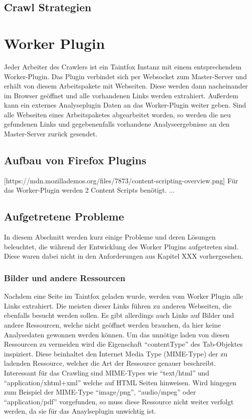 \subsection{Crawl Strategien}
\section{Worker Plugin}
Jeder Arbeiter des Crawlers ist ein Taintfox Instanz mit einem entsprechendem Worker-Plugin. Das Plugin verbindet sich per Websocket zum Master-Server und erhält von diesem Arbeitspakete mit Webseiten. Diese werden dann nacheinander im Browser geöffnet und alle vorhandenen Links werden extrahiert. Außerdem kann ein externes Analyseplugin Daten an das Worker-Plugin weiter geben. Sind alle Webseiten eines Arbeitspaketes abgearbeitet worden, so werden die neu gefundenen Links und gegebenenfalls vorhandene Analyseergebnisse an den Master-Server zurück gesendet.
\subsection{Aufbau von Firefox Plugins}
 [https://mdn.mozillademos.org/files/7873/content-scripting-overview.png]
Für das Worker-Plugin werden 2 Content Scripts benötigt. ...
\subsection{Aufgetretene Probleme}
In diesem Abschnitt werden kurz einige Probleme und deren Lösungen beleuchtet, die während der Entwicklung des Worker Plugins aufgetreten sind. Diese waren dabei nicht in den Anforderungen aus Kapitel XXX vorhergesehen.
\subsubsection{Bilder und andere Ressourcen}
Nachdem eine Seite im Taintfox geladen wurde, werden vom Worker Plugin alle Links extrahiert. Die meisten dieser Links führen zu anderen Webseiten, die ebenfalls besucht werden sollen. Es gibt allerdings auch Links auf Bilder und andere Ressourcen, welche nicht geöffnet werden brauchen, da hier keine Analysedaten gewonnen werden können. Um das unnötige laden von diesen Ressourcen zu vermeiden wird die Eigenschaft \enquote{contentType} des Tab-Objektes inspiziert. Diese beinhaltet den Internet Media Type (MIME-Type) der zu ladenden Ressource, welcher die Art der Ressource genauer beschreibt. Interessant für das Crawling sind MIME-Types wie \enquote{text/html} und \enquote{application/xhtml+xml} welche auf HTML Seiten hinweisen. Wird hingegen zum Beispiel der MIME-Type \enquote{image/png}, \enquote{audio/mpeg} oder \enquote{application/pdf} vorgefunden, so muss diese Ressource nicht weiter verfolgt werden, da sie für das Anaylseplugin unwichtig ist. 
